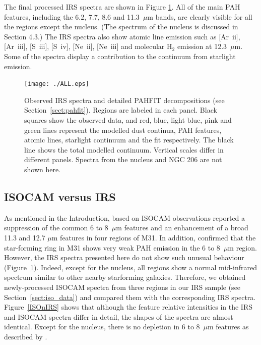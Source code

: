 
The final processed IRS spectra are shown in  Figure \ref{PAHFITplots}. All of the main PAH features, including the 6.2, 7.7, 8.6 and 11.3~$\mu$m bands, 
are clearly visible for all the regions except the nucleus. (The spectrum of the nucleus is discussed in Section 4.3.)
The IRS spectra also show atomic line emission such as [Ar~{\sc ii}], [Ar~{\sc iii}], [S~{\sc iii}], [S~{\sc iv}], [Ne~{\sc ii}], [Ne~{\sc iii}] 
and molecular H$_{2}$ emission at 12.3~$\mu$m. Some of the spectra display a contribution to the continuum from starlight emission.


\begin{figure}
\centering
\texttt{[image: ./ALL.eps]}
 \caption{Observed IRS spectra and detailed PAHFIT decompositions (see Section~\ref{sect:pahfit}). Regions are labeled in each panel.
Black squares show the observed data, and red, blue, light blue, pink and green lines represent the modelled
dust continua, PAH features, atomic lines, starlight continuum and the fit respectively. The black line shows the total modelled continuum. 
Vertical scales differ in different panels. Spectra from the nucleus and NGC 206 are not shown here.
}
\label{PAHFITplots}
\end{figure}


\subsection{ISOCAM versus IRS}
\label{sect:iso_vs_irs}

As mentioned in the Introduction, based on ISOCAM observations \citet{1998Cesarsky} reported a suppression of the common 
6 to 8~$\mu$m features and an enhancement of a broad 11.3 and 12.7 $\mu$m features in four regions of M31. 
In addition, \citet{Pagani_1999} confirmed that the star-forming ring in M31 shows very weak PAH emission in the 6 to 8~$\mu$m region. 
However, the IRS spectra presented here do not show such unusual behaviour (Figure~\ref{PAHFITplots}). 
Indeed, except for the nucleus, all regions show a normal mid-infrared spectrum similar to other nearby starforming galaxies. 
Therefore, we obtained newly-processed ISOCAM spectra from three regions in our IRS sample (see Section~\ref{sect:iso_data}) 
and compared them with the corresponding IRS spectra.
Figure~\ref{ISOnIRS} shows that although the feature relative intensities  in the IRS and ISOCAM 
spectra differ in detail, the shapes of the spectra are almost identical. Except for the nucleus, there is no depletion in 
6 to 8~$\mu$m features as described by \citet{1998Cesarsky}. 


